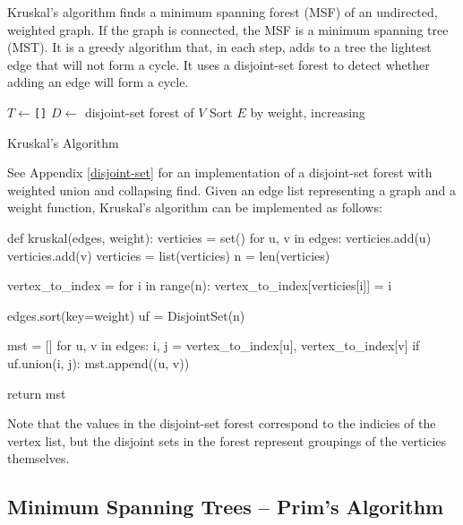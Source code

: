 \documentclass[12pt, titlepage]{article}
\begin{document}
Kruskal's algorithm finds a minimum spanning forest (MSF) of an undirected, weighted graph. If the graph is connected, the MSF is a minimum spanning tree (MST). It is a greedy algorithm that, in each step, adds to a tree the lightest edge that will not form a cycle. It uses a disjoint-set forest to detect whether adding an edge will form a cycle. \\

\begin{algorithm}[H]
  \SetAlgoLined
  \DontPrintSemicolon
  $T \longleftarrow$\hspace{0.5mm}\texttt{[]}\;
  $D \longleftarrow$\hspace{0.5mm} disjoint-set forest of $V$\;
  Sort $E$ by weight, increasing\;
  \;
  \caption{Kruskal's Algorithm}
\end{algorithm} \medskip

See Appendix \ref{disjoint-set} for an implementation of a disjoint-set forest with weighted union and collapsing find. Given an edge list representing a graph and a weight function, Kruskal's algorithm can be implemented as follows: \medskip

\begin{python}
def kruskal(edges, weight):
    verticies = set()
    for u, v in edges:
        verticies.add(u)
        verticies.add(v)
    verticies = list(verticies)
    n = len(verticies)

    vertex_to_index = {}
    for i in range(n):
        vertex_to_index[verticies[i]] = i

    edges.sort(key=weight)
    uf = DisjointSet(n)

    mst = []
    for u, v in edges:
        i, j = vertex_to_index[u], vertex_to_index[v]
        if uf.union(i, j):
            mst.append((u, v))

    return mst
\end{python}

Note that the values in the disjoint-set forest correspond to the indicies of the vertex list, but the disjoint sets in the forest represent groupings of the verticies themselves.

\subsection{Minimum Spanning Trees -- Prim's Algorithm} \label{prim}
\end{document}
